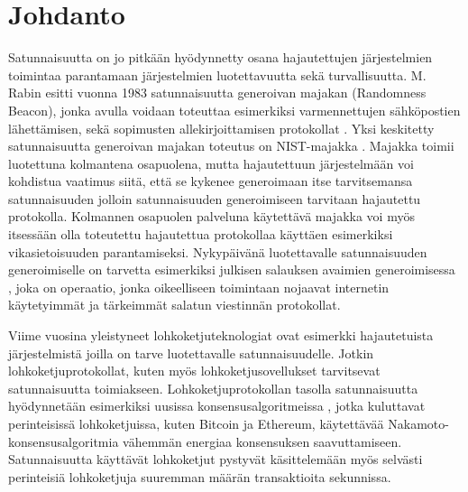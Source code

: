 \chapter{Johdanto\label{intro}}

Satunnaisuutta on jo pitkään hyödynnetty osana hajautettujen järjestelmien toimintaa parantamaan järjestelmien luotettavuutta sekä turvallisuutta. M. Rabin esitti vuonna 1983 satunnaisuutta generoivan majakan (Randomness Beacon), jonka avulla voidaan toteuttaa esimerkiksi varmennettujen sähköpostien lähettämisen, sekä sopimusten allekirjoittamisen protokollat \cite{rabin_transaction_1983}. Yksi keskitetty satunnaisuutta generoivan majakan toteutus on NIST-majakka \cite{computer_security_division_interoperable_2019}. Majakka toimii luotettuna kolmantena osapuolena, mutta hajautettuun järjestelmään voi kohdistua vaatimus siitä, että se kykenee generoimaan itse tarvitsemansa satunnaisuuden jolloin satunnaisuuden generoimiseen tarvitaan hajautettu protokolla. Kolmannen osapuolen palveluna käytettävä majakka voi myös itsessään olla toteutettu hajautettua protokollaa käyttäen esimerkiksi vikasietoisuuden parantamiseksi. Nykypäivänä luotettavalle satunnaisuuden generoimiselle on tarvetta esimerkiksi julkisen salauksen avaimien generoimisessa \cite{corrigan-gibbs_ensuring_2014}, joka on operaatio, jonka oikeelliseen toimintaan nojaavat internetin käytetyimmät ja tärkeimmät salatun viestinnän protokollat. 

Viime vuosina yleistyneet lohkoketjuteknologiat ovat esimerkki hajautetuista järjestelmistä joilla on tarve luotettavalle satunnaisuudelle. Jotkin lohkoketjuprotokollat, kuten myös lohkoketjusovellukset tarvitsevat satunnaisuutta toimiakseen. Lohkoketjuprotokollan tasolla satunnaisuutta hyödynnetään esimerkiksi uusissa konsensusalgoritmeissa \cite{gilad_algorand_2017, hanke_dfinity_2018}, jotka kuluttavat perinteisissä lohkoketjuissa, kuten Bitcoin ja Ethereum, käytettävää Nakamoto-konsensusalgoritmia vähemmän energiaa konsensuksen saavuttamiseen. Satunnaisuutta käyttävät lohkoketjut pystyvät käsittelemään myös selvästi perinteisiä lohkoketjuja suuremman määrän transaktioita sekunnissa.

